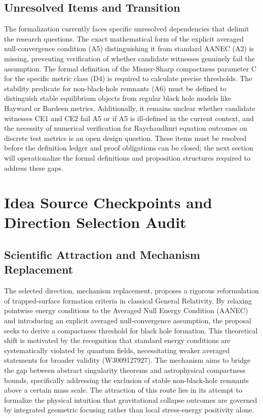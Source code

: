 \documentclass[conference]{IEEEtran}
\begin{document}
\subsection{Unresolved Items and Transition}
The formalization currently faces specific unresolved dependencies that delimit the research questions. The exact mathematical form of the explicit averaged null-convergence condition (A5) distinguishing it from standard AANEC (A2) is missing, preventing verification of whether candidate witnesses genuinely fail the assumption. The formal definition of the Misner-Sharp compactness parameter C for the specific metric class (D4) is required to calculate precise thresholds. The stability predicate for non-black-hole remnants (A6) must be defined to distinguish stable equilibrium objects from regular black hole models like Hayward or Bardeen metrics. Additionally, it remains unclear whether candidate witnesses CE1 and CE2 fail A5 or if A5 is ill-defined in the current context, and the necessity of numerical verification for Raychaudhuri equation outcomes on discrete test metrics is an open design question. These items must be resolved before the definition ledger and proof obligations can be closed; the next section will operationalize the formal definitions and proposition structures required to address these gaps.

\section{Idea Source Checkpoints and Direction Selection Audit}
\subsection{Scientific Attraction and Mechanism Replacement}
The selected direction, mechanism replacement, proposes a rigorous reformulation of trapped-surface formation criteria in classical General Relativity. By relaxing pointwise energy conditions to the Averaged Null Energy Condition (AANEC) and introducing an explicit averaged null-convergence assumption, the proposal seeks to derive a compactness threshold for black hole formation. This theoretical shift is motivated by the recognition that standard energy conditions are systematically violated by quantum fields, necessitating weaker averaged statements for broader validity (W3009127927). The mechanism aims to bridge the gap between abstract singularity theorems and astrophysical compactness bounds, specifically addressing the exclusion of stable non-black-hole remnants above a certain mass scale. The attraction of this route lies in its attempt to formalize the physical intuition that gravitational collapse outcomes are governed by integrated geometric focusing rather than local stress-energy positivity alone.~\cite{cite_0ed84243cf171bc4}
\end{document}
